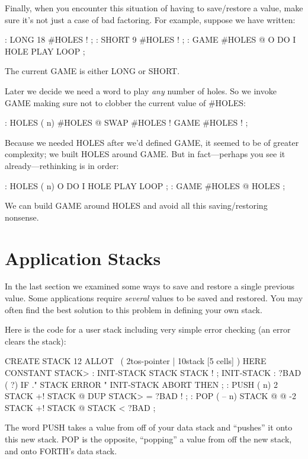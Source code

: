 Finally, when you encounter this situation of having to save/restore a
value, make sure it's not just a case of bad factoring. For example,
suppose we have written:

\begin{Code}
: LONG   18 #HOLES ! ;
: SHORT   9 #HOLES ! ;
: GAME   #HOLES @  O DO  I HOLE PLAY  LOOP ;
\end{Code}
The current GAME is either LONG or SHORT.

Later we decide we need a word to play \emph{any} number of holes. So we
invoke GAME making sure not to clobber the current value of \#HOLES:

\begin{Code}
: HOLES  ( n)  #HOLES @  SWAP #HOLES !  GAME  #HOLES ! ;
\end{Code}
Because we needed HOLES after we'd defined GAME, it seemed to be of
greater complexity; we built HOLES around GAME. But in fact---perhaps
you see it already---rethinking is in order:

\begin{Code}
: HOLES ( n)  O DO  I HOLE PLAY  LOOP ;
: GAME   #HOLES @ HOLES ;
\end{Code}
We can build GAME around HOLES and avoid all this saving/restoring
nonsense.

\section{Application Stacks}

In the last section we examined some ways to save and restore a single
previous value. Some applications require \emph{several} values to be saved and
restored. You may often find the best solution to this problem in defining
your own stack.

Here is the code for a user stack including very simple error checking
(an error clears the stack):

\begin{Code}
CREATE STACK  12 ALLOT  \  ( 2tos-pointer | 10stack [5 cells] )
HERE CONSTANT STACK>
: INIT-STACK   STACK STACK ! ;   INIT-STACK
: ?BAD  ( ?)   IF ." STACK ERROR "  INIT-STACK  ABORT  THEN ;
: PUSH  ( n)   2 STACK +!  STACK @  DUP  STACK> = ?BAD  ! ;
: POP  ( -- n)  STACK @ @  -2 STACK +!  STACK @ STACK < ?BAD ;
\end{Code}
The word PUSH takes a value from off of your data stack and ``pushes''
it onto this new stack. POP is the opposite, ``popping'' a value from off
the new stack, and onto FORTH's data stack.

